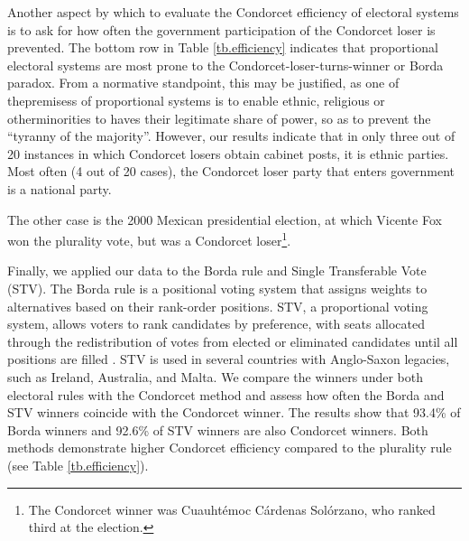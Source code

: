 \documentclass[12pt]{scrartcl}
\begin{document}
Another aspect by which to evaluate the Condorcet efficiency of electoral systems is to ask for how often the government participation of the Condorcet loser is prevented. The bottom row in Table \ref{tb.efficiency} indicates that proportional electoral systems are most prone to the Condorcet-loser-turns-winner or Borda paradox. From a normative standpoint, this may be justified, as one of thepremisess of proportional systems is to enable ethnic, religious or otherminorities to haves their legitimate share of power, so as to prevent the ``tyranny of the majority''. However, our results indicate that in only three out of 20 instances in which Condorcet losers obtain cabinet posts, it is ethnic parties. Most often (4 out of 20 cases), the Condorcet loser party that enters government is a national party. 


The other case is the 2000 Mexican presidential election, at which Vicente Fox won the plurality vote, but was a Condorcet loser\footnote{
 The Condorcet winner was Cuauht\'{e}moc C\'{a}rdenas Sol\'{o}rzano, who ranked third at the election.
}.

Finally, we applied our data to the Borda rule and Single Transferable Vote (STV). The Borda rule is a positional voting system that assigns weights to alternatives based on their rank-order positions. STV, a proportional voting system, allows voters to rank candidates by preference, with seats allocated through the redistribution of votes from elected or eliminated candidates until all positions are filled \citep{Tideman1995}. STV is used in several countries with Anglo-Saxon legacies, such as Ireland, Australia, and Malta. We compare the winners under both electoral rules with the Condorcet method and assess how often the Borda and STV winners coincide with the Condorcet winner. The results show that 93.4\% of Borda winners and 92.6\% of STV winners are also Condorcet winners. Both methods demonstrate higher Condorcet efficiency compared to the plurality rule (see Table \ref{tb.efficiency}). 
\end{document}
